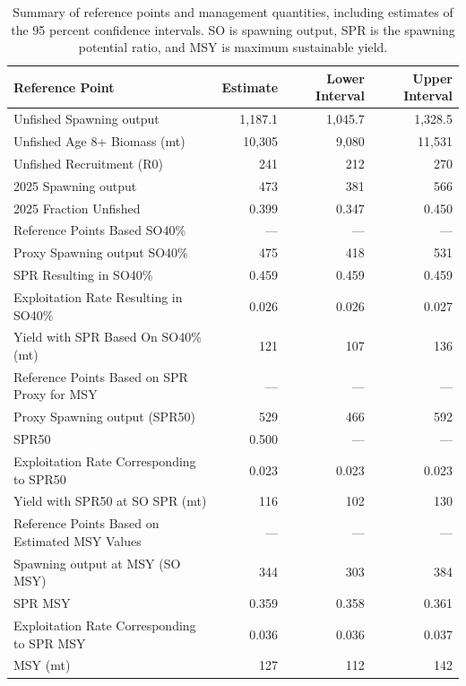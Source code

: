\documentclass[
]{scrartcl}
\begin{document}
\begin{longtable}{lrrr}

\caption{\label{tbl-ref-points-es-1}Summary of reference points and
management quantities, including estimates of the 95 percent confidence
intervals. SO is spawning output, SPR is the spawning potential ratio,
and MSY is maximum sustainable yield.}

\tabularnewline

\toprule
Reference Point & Estimate & Lower Interval & Upper Interval \\ 
\midrule\addlinespace[2.5pt]
Unfished Spawning output & 1,187.1 & 1,045.7 & 1,328.5 \\ 
Unfished Age 8+ Biomass (mt) & 10,305 & 9,080 & 11,531 \\ 
Unfished Recruitment (R0) & 241 & 212 & 270 \\ 
2025 Spawning output & 473 & 381 & 566 \\ 
2025 Fraction Unfished & 0.399 & 0.347 & 0.450 \\ 
Reference Points Based SO40\% & — & — & — \\ 
Proxy Spawning output SO40\% & 475 & 418 & 531 \\ 
SPR Resulting in SO40\% & 0.459 & 0.459 & 0.459 \\ 
Exploitation Rate Resulting in SO40\% & 0.026 & 0.026 & 0.027 \\ 
Yield with SPR Based On SO40\% (mt) & 121 & 107 & 136 \\ 
Reference Points Based on SPR Proxy for MSY & — & — & — \\ 
Proxy Spawning output (SPR50) & 529 & 466 & 592 \\ 
SPR50 & 0.500 & — & — \\ 
Exploitation Rate Corresponding to SPR50 & 0.023 & 0.023 & 0.023 \\ 
Yield with SPR50 at SO SPR (mt) & 116 & 102 & 130 \\ 
Reference Points Based on Estimated MSY Values & — & — & — \\ 
Spawning output at MSY (SO MSY) & 344 & 303 & 384 \\ 
SPR MSY & 0.359 & 0.358 & 0.361 \\ 
Exploitation Rate Corresponding to SPR MSY & 0.036 & 0.036 & 0.037 \\ 
MSY (mt) & 127 & 112 & 142 \\ 
\bottomrule

\end{longtable}

\endgroup
\end{document}
